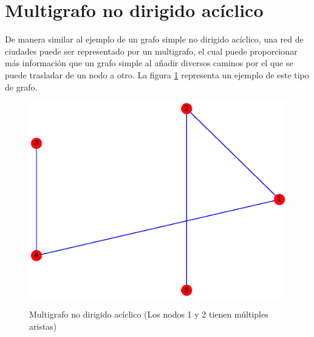 \documentclass{article}
\begin{document}
\section{Multigrafo no dirigido acíclico}
De manera similar al ejemplo de un grafo simple no dirigido acíclico, una red de ciudades puede ser representado por un multigrafo, el cual puede proporcionar más información que un grafo simple al añadir diversos caminos por el que se puede trasladar de un nodo a otro. La figura \ref{fig:MNDA} representa un ejemplo de este tipo de grafo.
\begin{figure}[h!]
    \caption{Multigrafo no dirigido acíclico (Los nodos 1 y 2 tienen múltiples aristas)}
    \includegraphics[width=\textwidth]{7-MNDA}
    \label{fig:MNDA}
\end{figure}



\end{document}
